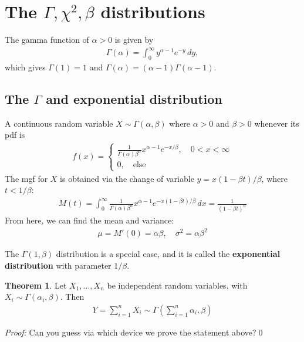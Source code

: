 \documentclass{book}
\theoremstyle{definition}
\newtheorem{thm}{Theorem}[section]
\newcommand{\f}[2]{\frac{#1}{#2}}
\newcommand{\lp}{\left(}
\newcommand{\rp}{\right)}
\begin{document}
\section{The $\Gamma, \chi^2, \beta$ distributions}

The gamma function of $\alpha > 0$ is given by
\begin{align}
\Gamma(\alpha) =\int^\infty_0 y^{\alpha-1}e^{-y}\,dy,
\end{align}
which gives $\Gamma(1) = 1$ and $\Gamma(\alpha) = (\alpha-1)\Gamma(\alpha-1)$. 

\subsection{The $\Gamma$ and exponential distribution}
A continuous random variable $X \sim \Gamma(\alpha,\beta)$ where $\alpha > 0$ and $\beta > 0$ whenever its pdf is
\begin{align}
\boxed{f(x) = \begin{cases}
	\f{1}{\Gamma(\alpha)\beta^\alpha}x^{\alpha-1} e^{-x/\beta}, \quad 0 < x < \infty\\
	0, \quad \text{else}
	\end{cases}}
\end{align}
The mgf for $X$ is obtained via the change of variable $y = x(1-\beta t)/\beta$, where $t < 1/\beta$:
\begin{align}
\boxed{M(t) = \int^\infty_0 \f{1}{\Gamma(\alpha)\beta^\alpha} x^{\alpha-1} e^{-x(1-\beta t)/\beta}\,dx = \f{1}{(1-\beta t)^\alpha}}
\end{align}
From here, we can find the mean and variance:
\begin{align}
\boxed{\mu = M'(0) = \alpha\beta, \quad \sigma^2 = \alpha \beta^2}
\end{align}

The $\Gamma(1,\beta)$ distribution is a special case, and it is called the \textbf{exponential distribution} with parameter $1/\beta$.\\

\begin{thm} Let $X_1, \dots, X_n$ be independent random variables, with $X_i \sim \Gamma(\alpha_i, \beta)$. Then
\begin{align}
\boxed{Y = \sum^n_{i=1} X_i \sim \Gamma\lp \sum^n_{i=1}\alpha_i, \beta \rp}
\end{align} 
\end{thm}
\noindent\textit{Proof:} Can you guess via which device we prove the statement above?\qed
\end{document}
